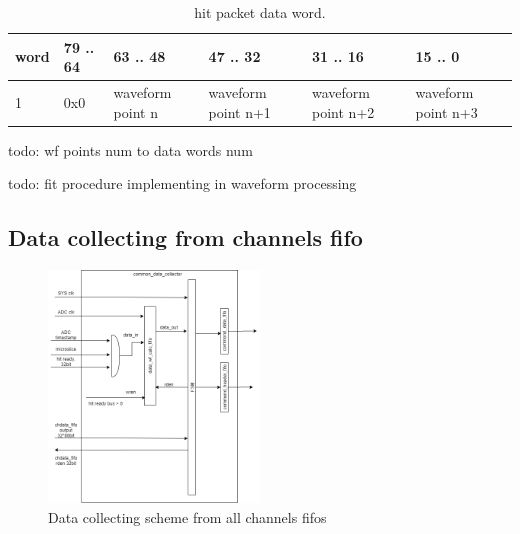 \documentclass{article}
\begin{document}
\begin{table}[H]
\centering
\begin{tabular}{| l | l | l | l | l | l |}
\hline
word & 79 .. 64 & 63 .. 48 & 47 .. 32 & 31 .. 16 & 15 .. 0 \\ \hline
1 & 0x0 & waveform point n & waveform point n+1 & waveform point n+2 & waveform point n+3 \\ \hline
\end{tabular}
\caption{hit packet data word.\label{tab2}}
\end{table}


todo: wf points num to data words num

todo: fit procedure implementing in waveform processing

\subsection{Data collecting from channels fifo}

\begin{figure}[H]
	\centering 
	\includegraphics[width=0.5\textwidth]{ADC_common_event_collection.png}
	\caption{\label{fig:1} Data collecting scheme from all channels fifos}
\end{figure}
\end{document}
